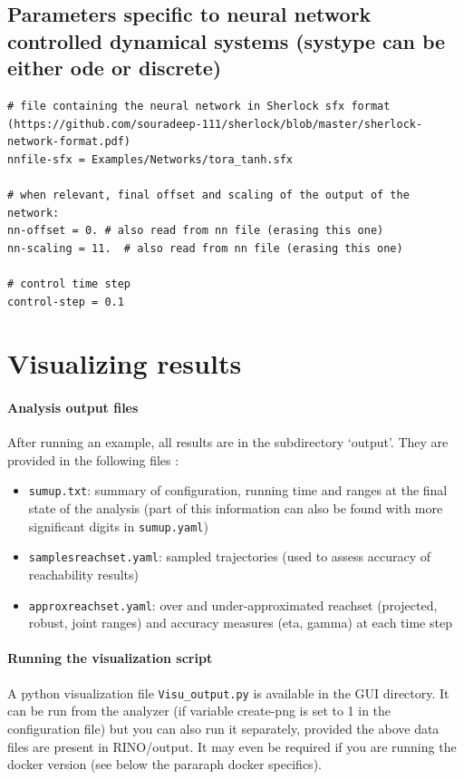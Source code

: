 \documentclass{article}
\begin{document}
\subsection{Parameters specific to neural network controlled dynamical systems (systype can be either ode or discrete)}

\begin{verbatim}
# file containing the neural network in Sherlock sfx format (https://github.com/souradeep-111/sherlock/blob/master/sherlock-network-format.pdf) 
nnfile-sfx = Examples/Networks/tora_tanh.sfx

# when relevant, final offset and scaling of the output of the network:
nn-offset = 0. # also read from nn file (erasing this one)
nn-scaling = 11.  # also read from nn file (erasing this one)

# control time step
control-step = 0.1
\end{verbatim}



\section{Visualizing results \label{visu}}

\paragraph{Analysis output files}
After running an example, all results are in the subdirectory ‘output’. They are provided in the following files : 
\begin{itemize}[noitemsep]
\item \texttt{sumup.txt}: summary of configuration, running time and ranges at the final state of the analysis (part of this information can also be found with more significant digits in \texttt{sumup.yaml})
\item \texttt{samplesreachset.yaml}: sampled trajectories (used to assess accuracy of reachability results)
\item \texttt{approxreachset.yaml}: over and under-approximated reachset (projected, robust, joint ranges) and accuracy measures (eta, gamma) at each time step 
\end{itemize}

\paragraph{Running the visualization script}
A python visualization file \texttt{Visu\_output.py} is available in the GUI directory. It can be run from the analyzer (if variable create-png is set to 1 in the configuration file) but you can also run it separately,  provided the above data files are present in RINO/output.  It may even be required if you are running the docker version (see below the pararaph docker specifics).
\end{document}

